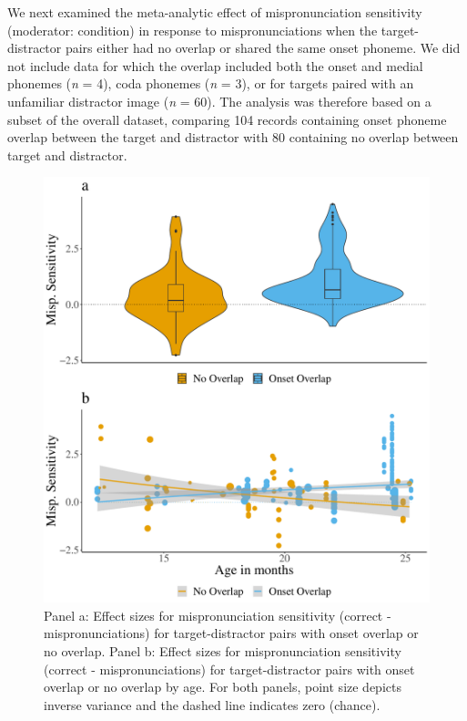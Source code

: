 \documentclass[man]{apa6}
\begin{document}
We next examined the meta-analytic effect of mispronunciation sensitivity (moderator: condition) in response to mispronunciations when the target-distractor pairs either had no overlap or shared the same onset phoneme. We did not include data for which the overlap included both the onset and medial phonemes (\emph{n} = 4), coda phonemes (\emph{n} = 3), or for targets paired with an unfamiliar distractor image (\emph{n} = 60). The analysis was therefore based on a subset of the overall dataset, comparing 104 records containing onset phoneme overlap between the target and distractor with 80 containing no overlap between target and distractor.

\begin{figure}
\centering
\includegraphics{VonHolzenBergmann_MPMetaAnalysis_files/figure-latex/PlotDistOverlap-1.pdf}
\caption{\label{fig:PlotDistOverlap}Panel a: Effect sizes for mispronunciation sensitivity (correct - mispronunciations) for target-distractor pairs with onset overlap or no overlap. Panel b: Effect sizes for mispronunciation sensitivity (correct - mispronunciations) for target-distractor pairs with onset overlap or no overlap by age. For both panels, point size depicts inverse variance and the dashed line indicates zero (chance).}
\end{figure}
\end{document}
